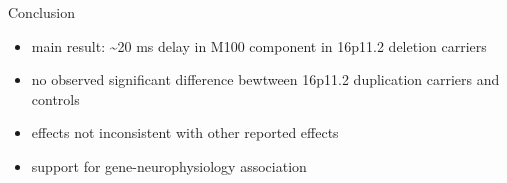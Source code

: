 \begin{frame}{Conclusion}

\begin{itemize}
\itemsep1pt\parskip0pt
\item
  main result: \textasciitilde{}20 ms delay in M100 component in 16p11.2
  deletion carriers\\
\item
  no observed significant difference bewtween 16p11.2 duplication
  carriers and controls\\
\item
  effects not inconsistent with other reported effects
\item
  support for gene-neurophysiology association
\end{itemize}

\end{frame}
